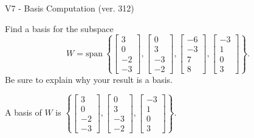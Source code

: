 \begin{exercise}
  \begin{exerciseTitle}V7 - Basis Computation (ver. 312)\end{exerciseTitle}
  \begin{exerciseStatement}
    Find a basis for the subspace 
\[W=\mathrm{span}\ \left\{\left[\begin{array}{r}
3 \\
0 \\
-2 \\
-3
\end{array}\right] , \left[\begin{array}{r}
0 \\
3 \\
-3 \\
-2
\end{array}\right] , \left[\begin{array}{r}
-6 \\
-3 \\
7 \\
8
\end{array}\right] , \left[\begin{array}{r}
-3 \\
1 \\
0 \\
3
\end{array}\right]\right\}.\]
 Be sure to explain why your result is a basis.


  \end{exerciseStatement}
  \begin{exerciseAnswer}
   A basis of \(W\) is  \(\left\{\left[\begin{array}{r}
3 \\
0 \\
-2 \\
-3
\end{array}\right] , \left[\begin{array}{r}
0 \\
3 \\
-3 \\
-2
\end{array}\right] , \left[\begin{array}{r}
-3 \\
1 \\
0 \\
3
\end{array}\right]\right\}\).
  


  \end{exerciseAnswer}
\end{exercise}